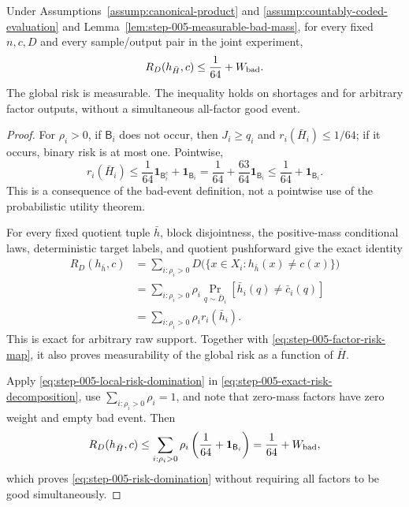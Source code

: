 \begin{proposition}
\label{prop:step-005-risk-domination}
Under Assumptions~\ref{assump:canonical-product} and
\ref{assump:countably-coded-evaluation} and
Lemma~\ref{lem:step-005-measurable-bad-mass}, for every fixed \(n,c,D\)
and every sample/output pair in the joint experiment,
\begin{equation}\label{eq:step-005-risk-domination}
R_D(h_{\bar H},c)\le\frac1{64}+W_{\rm bad}.
\end{equation}
The global risk is measurable.  The inequality holds on shortages and for
arbitrary factor outputs, without a simultaneous all-factor good event.
\end{proposition}

\begin{proof}
For \(\rho_i>0\), if \(\mathsf B_i\) does not occur, then
\(J_i\ge q_i\) and \(r_i(\bar H_i)\le1/64\); if it occurs, binary risk is
at most one.  Pointwise,
\begin{equation}\label{eq:step-005-local-risk-domination}
r_i(\bar H_i)
\le\frac1{64}\mathbf1_{\mathsf B_i^c}+\mathbf1_{\mathsf B_i}
=\frac1{64}+\frac{63}{64}\mathbf1_{\mathsf B_i}
\le\frac1{64}+\mathbf1_{\mathsf B_i}.
\end{equation}
This is a consequence of the bad-event definition, not a pointwise use of
the probabilistic utility theorem.

For every fixed quotient tuple \(\bar h\), block disjointness, the
positive-mass conditional laws, deterministic target labels, and quotient
pushforward give the exact identity
\begin{equation}\label{eq:step-005-exact-risk-decomposition}
\begin{split}
R_D(h_{\bar h},c)
&=\sum_{i:\rho_i>0}
D\bigl(\{x\in X_i:h_{\bar h}(x)\ne c(x)\}\bigr)\\
&=\sum_{i:\rho_i>0}\rho_i
\Pr_{q\sim\bar D_i}
[\bar h_i(q)\ne\bar c_i(q)]\\
&=\sum_{i:\rho_i>0}\rho_i r_i(\bar h_i).
\end{split}
\end{equation}
This is exact for arbitrary raw support.  Together with
\eqref{eq:step-005-factor-risk-map}, it also proves measurability of the
global risk as a function of \(\bar H\).

Apply \eqref{eq:step-005-local-risk-domination} in
\eqref{eq:step-005-exact-risk-decomposition}, use
\(\sum_{i:\rho_i>0}\rho_i=1\), and note that zero-mass factors have zero
weight and empty bad event.  Then
\[
R_D(h_{\bar H},c)
\le\sum_{i:\rho_i>0}\rho_i
\left(\frac1{64}+\mathbf1_{\mathsf B_i}\right)
=\frac1{64}+W_{\rm bad},
\]
which proves \eqref{eq:step-005-risk-domination} without requiring all
factors to be good simultaneously.
\end{proof}

